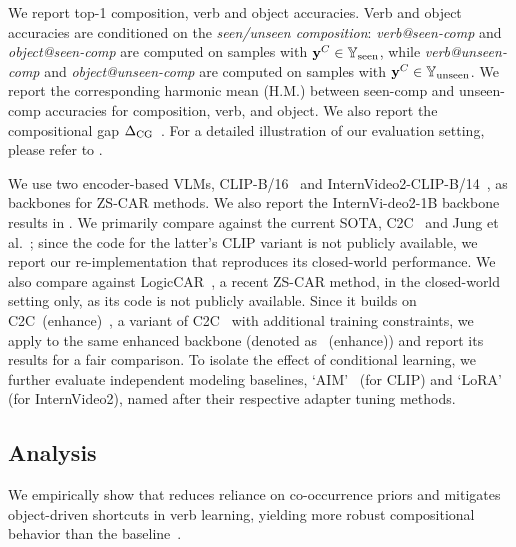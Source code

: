 



We report top-1 composition, verb and object accuracies.
Verb and object accuracies are conditioned on the \emph{seen/unseen composition}: \emph{verb@seen-comp} and \emph{object@seen-comp} are computed on samples with $\mathbf{y}^C \in \mathbb{Y}_{\text{seen}}$, while \emph{verb@unseen-comp} and \emph{object@unseen-comp} are computed on samples with $\mathbf{y}^C \in \mathbb{Y}_{\text{unseen}}$.
We report the corresponding harmonic mean (H.M.) between seen-comp and unseen-comp accuracies for composition, verb, and object.
We also report the compositional gap $\Delta_\mathrm{CG}$~.
For a detailed illustration of our evaluation setting, please refer to .






We use two encoder-based VLMs, CLIP-B/16~\cite{radford2021clip} and InternVideo2-CLIP-B/14~\cite{wang2024iv2}, as backbones for ZS-CAR methods.
We also report the InternVi-deo2-1B\cite{wang2024iv2} backbone results in .
We primarily compare \ours{} against the current SOTA, C2C~\cite{li2024c2c} and Jung et al.~\cite{jung2025crr}; since the code for the latter's CLIP variant is not publicly available, we report our re-implementation that reproduces its closed-world performance.
We also compare against LogicCAR~\cite{ye2025logic}, a recent ZS-CAR method, in the closed-world setting only, as its code is not publicly available.
Since it builds on C2C~(enhance)~\cite{li2024c2c}, a variant of C2C~\cite{li2024c2c} with additional training constraints,  we apply \ours{} to the same enhanced backbone (denoted as \ours{}~(enhance)) and report its results for a fair comparison.
To isolate the effect of conditional learning, we further evaluate independent modeling baselines, `AIM'~\cite{yang2023aim} (for CLIP) and `LoRA'~\cite{hu2022lora} (for InternVideo2), named after their respective adapter tuning methods.


\subsection{Analysis}
\label{sec:validation}

We empirically show that \ours{} reduces reliance on co-occurrence priors and mitigates object-driven shortcuts in verb learning, yielding more robust compositional behavior than the baseline~\cite{li2024c2c}.



